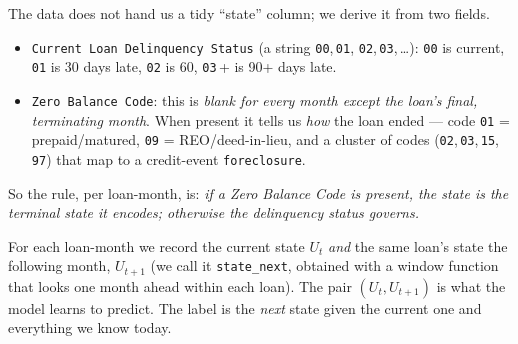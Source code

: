 \documentclass[11pt]{article}
\begin{document}
The data does not hand us a tidy ``state'' column; we derive it from two fields.

\begin{itemize}[leftmargin=1.4em, itemsep=2pt]
  \item \texttt{Current Loan Delinquency Status} (a string \texttt{00},\,\texttt{01},
        \texttt{02},\,\texttt{03},\,\dots): \texttt{00} is current, \texttt{01} is 30 days
        late, \texttt{02} is 60, \texttt{03}\,+ is 90+ days late.
  \item \texttt{Zero Balance Code}: this is \emph{blank for every month except the loan's
        final, terminating month}. When present it tells us \emph{how} the loan ended ---
        code \texttt{01} = prepaid/matured, \texttt{09} = REO/deed-in-lieu, and a cluster
        of codes (\texttt{02},\,\texttt{03},\,\texttt{15},\,\texttt{97}) that map to a
        credit-event \texttt{foreclosure}.
\end{itemize}

So the rule, per loan-month, is: \emph{if a Zero Balance Code is present, the state is the
terminal state it encodes; otherwise the delinquency status governs.}

\begin{keyidea}
For each loan-month we record the current state $U_t$ \emph{and} the same loan's state the
following month, $U_{t+1}$ (we call it \texttt{state\_next}, obtained with a window
function that looks one month ahead within each loan). The pair $(U_t, U_{t+1})$ is what
the model learns to predict. The label is the \emph{next} state given the current one and
everything we know today.
\end{keyidea}
\end{document}
